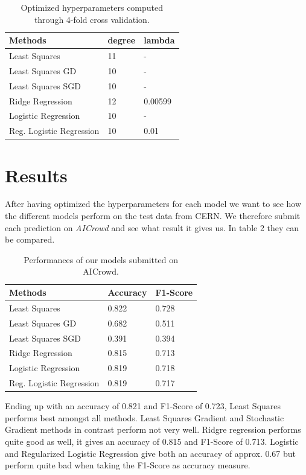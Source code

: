 \documentclass[10pt,conference,compsocconf]{IEEEtran}
\begin{document}
\begin{table}[htbp]
	\centering
	\begin{tabular}[c]{|l||l|l|}
		\hline
		Methods&degree&lambda\\
		\hline
		Least Squares& 11 &-\\
		Least Squares GD& 10 & -\\
		Least Squares SGD & 10 &-\\		Ridge Regression&12&0.00599\\
		Logistic Regression & 10&-\\
		Reg. Logistic Regression&10&0.01\\
		\hline
	\end{tabular}
	\caption{Optimized hyperparameters computed\\ through 4-fold cross validation.}
	\label{tab:hyperpam}
\end{table}

\newpage

\section{Results}


After having optimized the hyperparameters for each model we want to see how the different models perform on the test data from CERN. We therefore submit each prediction on \textit{AICrowd} and see what result it gives us. In table 2 they can be compared.


\begin{table}[h]
	\centering
	\begin{tabular}[c]{|l||l|l|}
		\hline
		Methods&Accuracy&F1-Score\\
	\hline
	Least Squares&0.822&0.728\\
	Least Squares GD&0.682&0.511\\
	Least Squares SGD&0.391&0.394\\		
	Ridge Regression&0.815&0.713\\
	Logistic Regression&0.819&0.718\\
	Reg. Logistic Regression&0.819&0.717\\
	\hline
	\end{tabular}
	\caption{Performances of our models submitted on AICrowd.}
	\label{tab:perform}
\end{table}

Ending up with an accuracy of 0.821 and F1-Score of 0.723, Least Squares performs best amongst all methods. Least Squares Gradient and Stochastic Gradient methods in contrast perform not very well. 
Ridgre regression performs quite good as well, it gives an accuracy of 0.815 and F1-Score of 0.713.
Logistic and Regularized Logistic Regression give both an accuracy of approx. 0.67 but perform quite bad when taking the F1-Score as accuracy measure. 
\end{document}
